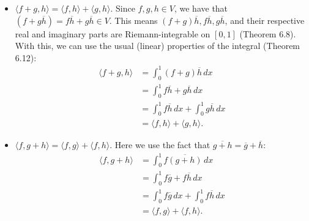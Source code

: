 \documentclass[11pt]{article}
\begin{document}
\begin{enumerate}[(a)]
\begin{itemize}
		\item $\boxed{\langle f+g ,h \rangle  = \langle f,h \rangle + \langle g,h\rangle}$. Since $f,g,h\in V$, we have that $(f+g\overline{h}) = f\overline{h} + g\overline{h} \in V$. This means $(f+g)\overline{h}, f\overline{h}, g\overline{h}$, and their respective real and imaginary parts are Riemann-integrable on $[0,1]$ (Theorem 6.8). With this, we can use the usual (linear) properties of the integral (Theorem 6.12):
		\begin{align*}
		\langle f+g,h\rangle &= \int^1_0 (f+g)\overline{h}\,dx\\
		&= \int^1_0 f\overline{h} + g\overline{h}\,dx\\
		&= \int^1_0 f\overline{h}\,dx + \int^1_0 g\overline{h}\,dx\\
		&= \langle f,h\rangle + \langle g,h\rangle.
		\end{align*}
		
		
		\item $\boxed{\langle f, g+h \rangle  = \langle f,g \rangle + \langle f,h\rangle}$. Here we use the fact that $\overline{g+h} = \overline{g} + \overline{h}$:
		\begin{align*}
		\langle f, g+h\rangle &= \int^1_0 f\overline{(g+h)}\,dx\\
		&= \int^1_0 f\overline{g} + f\overline{h}\,dx\\
		&= \int^1_0 f\overline{g}\,dx + \int^1_0 f\overline{h}\,dx\\
		&= \langle f,g\rangle + \langle f,h\rangle.
		\end{align*}
		

\end{itemize}
\end{enumerate}
\end{document}
